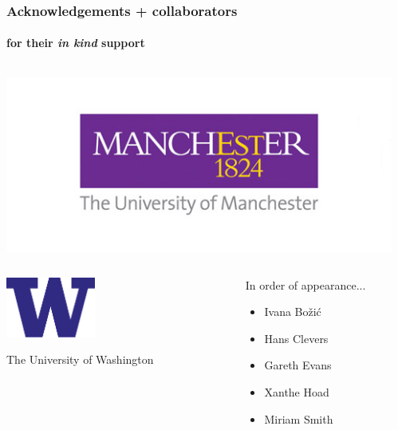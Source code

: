 \documentclass{beamer}
\begin{document}
%


\begin{frame}
    \frametitle{Acknowledgements + collaborators}
    \framesubtitle{for their \emph{in kind} support}
    \begin{columns}
        \begin{column}{0.5\textwidth}
        \includegraphics[width=\textwidth]{figures/logo_big.jpg}
        \end{column}
        \begin{column}{0.5\textwidth}

        \end{column}
    \end{columns}
    \begin{columns}
        \begin{column}{0.5\textwidth}
        \begin{center}
        \includegraphics[width=0.4\textwidth]{figures/W-Logo_Purple1}
        \end{center}

        The University of Washington
        \end{column}
        \begin{column}{0.5\textwidth}
        In order of appearance...

        \begin{itemize}
            \item Ivana Bo\v{z}i\'{c}
            \item Hans Clevers
            \item Gareth Evans
            \item Xanthe Hoad
            \item Miriam Smith
        \end{itemize}

        \end{column}
    \end{columns}

\end{frame}
\end{document}
